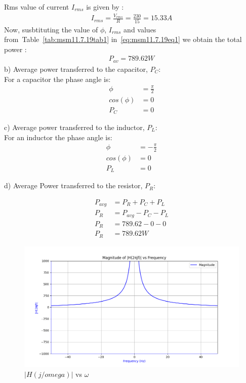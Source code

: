 \documentclass[journal,12pt,onecolumn]{IEEEtran}
\newcommand\tabref{Table~\ref}
\theoremstyle{remark}
\providecommand{\abs}[1]{\left\vert#1\right\vert}
\begin{document}
Rms value of current $I_{rms}$ is given by  :
\begin{align}
	I_{rms}=\frac{V_{rms}}{R}=\frac{230}{15}=15.33A
\end{align}
Now, susbtituting the value of $\phi$, $I_{rms}$ and values from~\tabref{tab:msm11.7.19tab1} in~\eqref{eq:msm11.7.19eq1} we obtain the total power :
\begin{align}
	P_{av}=789.62 W
\end{align}
b) Average power transferred to the capacitor, $P_C$:\\
For a capacitor the phase angle is:
\begin{align}
	\phi &= \frac{\pi}{2}\\
	cos(\phi) &= 0\\
	P_C &= 0
\end{align}	  

c) Average power transferred to the inductor, $P_L$:\\
For an inductor the phase angle is:
\begin{align}
	\phi &= -\frac{\pi}{2}\\
	cos(\phi) &= 0\\
	P_L &= 0
\end{align}	 

d) Average Power transferred to the resistor, $P_R$:

\begin{align}
	P_{avg} &= P_{R} + P_{C} + P_{L}\\
	P_{R} &= P_{avg} - P_{C} - P_{L}\\
	P_{R} &= 789.62 -0-0\\
	P_R &= 789.62W
\end{align}

\newpage
\begin{figure}[!h]
	\centering
	\includegraphics[width=\columnwidth]{ncert-physics/12/7/19/figs/rmagnitude.png}
	\caption{$\abs{H(j/omega)}$ vs $\omega$}
\end{figure}
\end{document}
